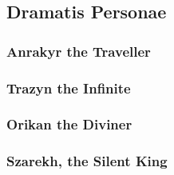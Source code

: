 \newpage
\subsection{Dramatis Personae}

\subsubsection{Anrakyr the Traveller}

\newpage
\subsubsection{Trazyn the Infinite}

\newpage
\subsubsection{Orikan the Diviner}

\newpage
\subsubsection{Szarekh, the Silent King}